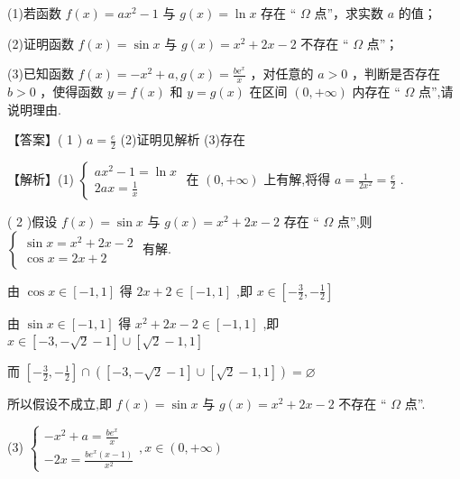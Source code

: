 \documentclass[10pt]{article}
\begin{document}
(1)若函数 \(f\left( x\right)  = a{x}^{2} - 1\) 与 \(g\left( x\right)  = \ln x\) 存在 “ \(\Omega\) 点”，求实数 \(a\) 的值；

(2)证明函数 \(f\left( x\right)  = \sin x\) 与 \(g\left( x\right)  = {x}^{2} + {2x} - 2\) 不存在 “ \(\Omega\) 点”；

(3)已知函数 \(f\left( x\right)  =  - {x}^{2} + a,g\left( x\right)  = \frac{b{\mathrm{e}}^{x}}{x}\) ，对任意的 \(a > 0\) ，判断是否存在 \(b > 0\) ，使得函数 \(y = f\left( x\right)\) 和 \(y = g\left( x\right)\) 在区间 \(\left( {0, + \infty }\right)\) 内存在 “ \(\Omega\) 点”,请说明理由.

【答案】( 1 ) \(a = \frac{e}{2}\) (2)证明见解析 (3)存在

【解析】(1) \(\left\{  \begin{matrix} a{x}^{2} - 1 = \ln x \\  {2ax} = \frac{1}{x} \end{matrix}\right.\) 在 \(\left( {0, + \infty }\right)\) 上有解,将得 \(a = \frac{1}{2{x}^{2}} = \frac{e}{2}\) .

( 2 )假设 \(f\left( x\right)  = \sin x\) 与 \(g\left( x\right)  = {x}^{2} + {2x} - 2\) 存在 “ \(\Omega\) 点”,则 \(\left\{  \begin{matrix} \sin x = {x}^{2} + {2x} - 2 \\  \cos x = {2x} + 2 \end{matrix}\right.\) 有解.

由 \(\cos x \in  \left\lbrack  {-1,1}\right\rbrack\) 得 \({2x} + 2 \in  \left\lbrack  {-1,1}\right\rbrack\) ,即 \(x \in  \left\lbrack  {-\frac{3}{2}, - \frac{1}{2}}\right\rbrack\)

由 \(\sin x \in  \left\lbrack  {-1,1}\right\rbrack\) 得 \({x}^{2} + {2x} - 2 \in  \left\lbrack  {-1,1}\right\rbrack\) ,即 \(x \in  \left\lbrack  {-3, - \sqrt{2} - 1}\right\rbrack   \cup  \left\lbrack  {\sqrt{2} - 1,1}\right\rbrack\)

而 \(\left\lbrack  {-\frac{3}{2}, - \frac{1}{2}}\right\rbrack   \cap  \left( {\left\lbrack  {-3, - \sqrt{2} - 1}\right\rbrack   \cup  \left\lbrack  {\sqrt{2} - 1,1}\right\rbrack  }\right)  = \varnothing\)

所以假设不成立,即 \(f\left( x\right)  = \sin x\) 与 \(g\left( x\right)  = {x}^{2} + {2x} - 2\) 不存在 “ \(\Omega\) 点”.

(3) \(\left\{  {\begin{matrix}  - {x}^{2} + a = \frac{b{e}^{x}}{x} \\   - {2x} = \frac{b{e}^{x}\left( {x - 1}\right) }{{x}^{2}} \end{matrix},x \in  \left( {0, + \infty }\right) }\right.\)
\end{document}
